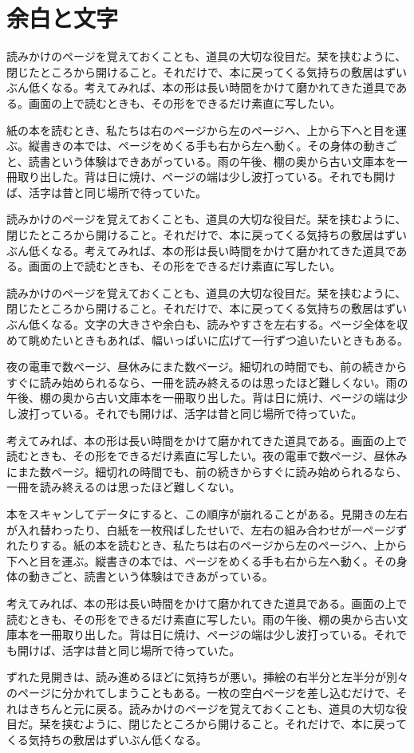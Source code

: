 \documentclass[a5paper,11pt]{ltjtbook}
\begin{document}
\chapter{余白と文字}
読みかけのページを覚えておくことも、道具の大切な役目だ。栞を挟むように、閉じたところから開けること。それだけで、本に戻ってくる気持ちの敷居はずいぶん低くなる。考えてみれば、本の形は長い時間をかけて磨かれてきた道具である。画面の上で読むときも、その形をできるだけ素直に写したい。

紙の本を読むとき、私たちは右のページから左のページへ、上から下へと目を運ぶ。縦書きの本では、ページをめくる手も右から左へ動く。その身体の動きごと、読書という体験はできあがっている。雨の午後、棚の奥から古い文庫本を一冊取り出した。背は日に焼け、ページの端は少し波打っている。それでも開けば、活字は昔と同じ場所で待っていた。

読みかけのページを覚えておくことも、道具の大切な役目だ。栞を挟むように、閉じたところから開けること。それだけで、本に戻ってくる気持ちの敷居はずいぶん低くなる。考えてみれば、本の形は長い時間をかけて磨かれてきた道具である。画面の上で読むときも、その形をできるだけ素直に写したい。

読みかけのページを覚えておくことも、道具の大切な役目だ。栞を挟むように、閉じたところから開けること。それだけで、本に戻ってくる気持ちの敷居はずいぶん低くなる。文字の大きさや余白も、読みやすさを左右する。ページ全体を収めて眺めたいときもあれば、幅いっぱいに広げて一行ずつ追いたいときもある。

夜の電車で数ページ、昼休みにまた数ページ。細切れの時間でも、前の続きからすぐに読み始められるなら、一冊を読み終えるのは思ったほど難しくない。雨の午後、棚の奥から古い文庫本を一冊取り出した。背は日に焼け、ページの端は少し波打っている。それでも開けば、活字は昔と同じ場所で待っていた。

考えてみれば、本の形は長い時間をかけて磨かれてきた道具である。画面の上で読むときも、その形をできるだけ素直に写したい。夜の電車で数ページ、昼休みにまた数ページ。細切れの時間でも、前の続きからすぐに読み始められるなら、一冊を読み終えるのは思ったほど難しくない。

本をスキャンしてデータにすると、この順序が崩れることがある。見開きの左右が入れ替わったり、白紙を一枚飛ばしたせいで、左右の組み合わせが一ページずれたりする。紙の本を読むとき、私たちは右のページから左のページへ、上から下へと目を運ぶ。縦書きの本では、ページをめくる手も右から左へ動く。その身体の動きごと、読書という体験はできあがっている。

考えてみれば、本の形は長い時間をかけて磨かれてきた道具である。画面の上で読むときも、その形をできるだけ素直に写したい。雨の午後、棚の奥から古い文庫本を一冊取り出した。背は日に焼け、ページの端は少し波打っている。それでも開けば、活字は昔と同じ場所で待っていた。

ずれた見開きは、読み進めるほどに気持ちが悪い。挿絵の右半分と左半分が別々のページに分かれてしまうこともある。一枚の空白ページを差し込むだけで、それはきちんと元に戻る。読みかけのページを覚えておくことも、道具の大切な役目だ。栞を挟むように、閉じたところから開けること。それだけで、本に戻ってくる気持ちの敷居はずいぶん低くなる。
\end{document}
